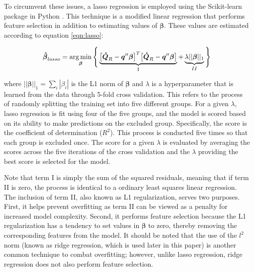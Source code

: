 \documentclass{article}
\begin{document}
To circumvent these issues, a lasso regression is employed using the Scikit-learn \cite{pedregosa2011scikit} package in Python . This technique is a modified linear regression that performs feature selection in addition to estimating values of $\boldsymbol{\beta}$. These values are estimated according to equation \ref{eqn:lasso}:

 \begin{equation}
  \label{eqn:lasso}
  \boldsymbol{\hat\beta}_{lasso} = \operatorname*{arg\,min}_{\boldsymbol{\beta}}\Bigg\{ \underbrace{\big[\boldsymbol{\dot{Q}}_{R} - \boldsymbol{q}'' \boldsymbol{\beta}\big]^T\big[ \boldsymbol{\dot{Q}}_{R} - \boldsymbol{q}'' \boldsymbol{\beta}\big]}_{\text{I}} + \underbrace{\lambda||\boldsymbol{\beta}||_1}_{II}   \Bigg\}
\end{equation}

\noindent where $||\boldsymbol{\beta}||_1 = \sum_i{|\beta_i|}$ is the L1 norm of $\boldsymbol{\beta}$ and $\lambda$ is a hyperparameter that is learned from the data through 5-fold cross validation. This refers to the process of randomly splitting the training set into five different groups. For a given $\lambda$, lasso regression is fit using four of the five groups, and the model is scored based on its ability to make predictions on the excluded group. Specifically, the score is the coefficient of determination ($R^2$). This process is conducted five times so that each group is excluded once. The score for a given $\lambda$ is evaluated by averaging the scores across the five iterations of the cross validation and the $\lambda$ providing the best score is selected for the model. 

Note that term I is simply the sum of the squared residuals, meaning that if term II is zero, the process is identical to a ordinary least squares linear regression. The inclusion of term II, also known as L1 regularization, serves two purposes. First, it helps prevent overfitting as term II can be viewed as a penalty for increased model complexity. Second, it performs feature selection because the L1 regularization has a tendency to set values in $\boldsymbol{\beta}$ to zero, thereby removing the corresponding features from the model. It should be noted that the use of the $l^2$ norm (known as ridge regression, which is used later in this paper) is another common technique to combat overfitting; however, unlike lasso regression, ridge regression does not also perform feature selection. 
\end{document}
